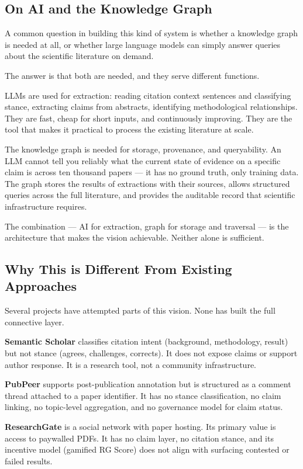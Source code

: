 \subsection*{On AI and the Knowledge Graph}

A common question in building this kind of system is whether a knowledge
graph is needed at all, or whether large language models can simply answer
queries about the scientific literature on demand.

The answer is that both are needed, and they serve different functions.

LLMs are used for extraction: reading citation context sentences and
classifying stance, extracting claims from abstracts, identifying
methodological relationships. They are fast, cheap for short inputs, and
continuously improving. They are the tool that makes it practical to process
the existing literature at scale.

The knowledge graph is needed for storage, provenance, and queryability. An
LLM cannot tell you reliably what the current state of evidence on a specific
claim is across ten thousand papers — it has no ground truth, only training
data. The graph stores the results of extractions with their sources, allows
structured queries across the full literature, and provides the auditable
record that scientific infrastructure requires.

The combination — AI for extraction, graph for storage and traversal — is the
architecture that makes the vision achievable. Neither alone is sufficient.

\subsection*{Why This is Different From Existing Approaches}

Several projects have attempted parts of this vision. None has built the full
connective layer.

\textbf{Semantic Scholar} classifies citation intent (background, methodology,
result) but not stance (agrees, challenges, corrects). It does not expose
claims or support author response. It is a research tool, not a community
infrastructure.

\textbf{PubPeer} supports post-publication annotation but is structured as a
comment thread attached to a paper identifier. It has no stance classification,
no claim linking, no topic-level aggregation, and no governance model for
claim status.

\textbf{ResearchGate} is a social network with paper hosting. Its primary
value is access to paywalled PDFs. It has no claim layer, no citation stance,
and its incentive model (gamified RG Score) does not align with surfacing
contested or failed results.

